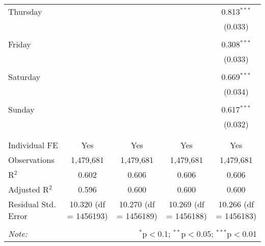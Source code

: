 \documentclass[
]{article}
\begin{document}
\begin{table}[!htbp]
{\begin{tabular}{@{\extracolsep{5pt}}lcccc}
 Thursday &  &  &  & 0.813$^{***}$ \\ 
  &  &  &  & (0.033) \\ 
  & & & & \\ 
 Friday &  &  &  & 0.308$^{***}$ \\ 
  &  &  &  & (0.033) \\ 
  & & & & \\ 
 Saturday &  &  &  & 0.669$^{***}$ \\ 
  &  &  &  & (0.034) \\ 
  & & & & \\ 
 Sunday &  &  &  & 0.617$^{***}$ \\ 
  &  &  &  & (0.032) \\ 
  & & & & \\ 
\hline \\[-1.8ex] 
Individual FE & Yes & Yes & Yes & Yes \\ 
Observations & 1,479,681 & 1,479,681 & 1,479,681 & 1,479,681 \\ 
R$^{2}$ & 0.602 & 0.606 & 0.606 & 0.606 \\ 
Adjusted R$^{2}$ & 0.596 & 0.600 & 0.600 & 0.600 \\ 
Residual Std. Error & 10.320 (df = 1456193) & 10.270 (df = 1456189) & 10.269 (df = 1456188) & 10.266 (df = 1456183) \\ 
\hline 
\hline \\[-1.8ex] 
\textit{Note:}  & \multicolumn{4}{r}{$^{*}$p$<$0.1; $^{**}$p$<$0.05; $^{***}$p$<$0.01} \\ 
\end{tabular}
} 
\end{table} 
\newpage
\end{document}
